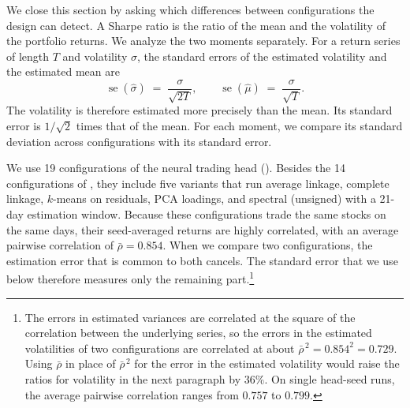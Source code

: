 We close this section by asking which differences between configurations the design can detect. A Sharpe ratio is the ratio of the mean and the volatility of the portfolio returns. We analyze the two moments separately. For a return series of length $T$ and volatility $\sigma$, the standard errors of the estimated volatility and the estimated mean are
%
\begin{equation}\label{eq:twose}
  \operatorname{se}(\hat\sigma) \;=\; \frac{\sigma}{\sqrt{2T}},
  \qquad
  \operatorname{se}(\hat\mu) \;=\; \frac{\sigma}{\sqrt{T}}.
\end{equation}
%
The volatility is therefore estimated more precisely than the mean. Its standard error is $1/\sqrt{2}$ times that of the mean. For each moment, we compare its standard deviation across configurations with its standard error.

We use 19 configurations of the neural trading head (). Besides the 14 configurations of , they include five variants that run average linkage, complete linkage, $k$-means on residuals, PCA loadings, and spectral (unsigned) with a 21-day estimation window. Because these configurations trade the same stocks on the same days, their seed-averaged returns are highly correlated, with an average pairwise correlation of $\bar\rho = 0.854$. When we compare two configurations, the estimation error that is common to both cancels. The standard error that we use below therefore measures only the remaining part.\footnote{The errors in estimated variances are correlated at the square of the correlation between the underlying series, so the errors in the estimated volatilities of two configurations are correlated at about $\bar\rho^{\,2} = 0.854^2 = 0.729$. Using $\bar\rho$ in place of $\bar\rho^{\,2}$ for the error in the estimated volatility would raise the ratios for volatility in the next paragraph by $36\%$. On single head-seed runs, the average pairwise correlation ranges from $0.757$ to $0.799$.}

